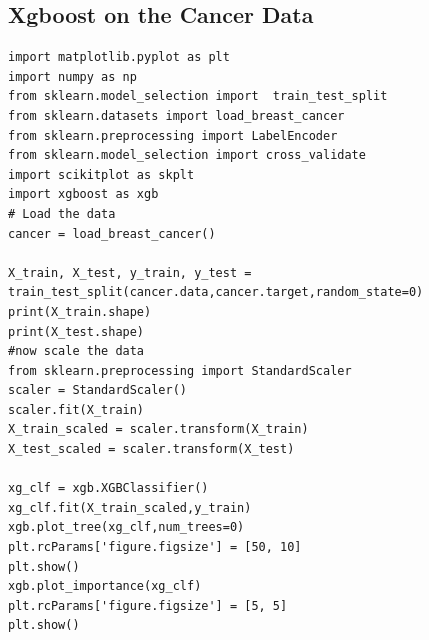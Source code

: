 \documentclass[%
oneside,                 %
final,                   %
10pt]{article}
\begin{document}
\subsection*{Xgboost on the Cancer Data}
\begin{verbatim}
import matplotlib.pyplot as plt
import numpy as np
from sklearn.model_selection import  train_test_split 
from sklearn.datasets import load_breast_cancer
from sklearn.preprocessing import LabelEncoder
from sklearn.model_selection import cross_validate
import scikitplot as skplt
import xgboost as xgb
# Load the data
cancer = load_breast_cancer()

X_train, X_test, y_train, y_test = train_test_split(cancer.data,cancer.target,random_state=0)
print(X_train.shape)
print(X_test.shape)
#now scale the data
from sklearn.preprocessing import StandardScaler
scaler = StandardScaler()
scaler.fit(X_train)
X_train_scaled = scaler.transform(X_train)
X_test_scaled = scaler.transform(X_test)

xg_clf = xgb.XGBClassifier()
xg_clf.fit(X_train_scaled,y_train)
xgb.plot_tree(xg_clf,num_trees=0)
plt.rcParams['figure.figsize'] = [50, 10]
plt.show()
xgb.plot_importance(xg_clf)
plt.rcParams['figure.figsize'] = [5, 5]
plt.show()
\end{verbatim}

\end{document}
